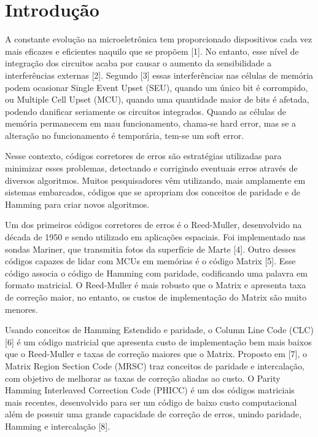 \chapter{Introdução}\label{CAP:introducao}

A constante evolução na microeletrônica tem proporcionado dispositivos cada vez mais eficazes e eficientes naquilo que se propõem [1]. No entanto, esse nível de integração dos circuitos acaba por causar o aumento da sensibilidade a interferências externas [2]. Segundo [3] essas interferências nas células de memória podem ocasionar Single Event Upset (SEU), quando um único bit é corrompido, ou Multiple Cell Upset (MCU), quando uma quantidade maior de bits é afetada, podendo danificar seriamente os circuitos integrados. Quando as células de memória permanecem em mau funcionamento, chama-se hard error, mas se a alteração no funcionamento é temporária, tem-se um soft error.

Nesse contexto, códigos corretores de erros são estratégias utilizadas para minimizar esses problemas, detectando e corrigindo eventuais erros através de diversos algoritmos. Muitos pesquisadores vêm utilizando, mais amplamente em sistemas embarcados, códigos que se apropriam dos conceitos de paridade e de Hamming para criar novos algoritmos.


Um dos primeiros códigos corretores de erros é o Reed-Muller, desenvolvido na década de 1950 e sendo utilizado em aplicações espaciais. Foi implementado nas sondas Mariner, que transmitia fotos da superfície de Marte [4]. Outro desses códigos capazes de lidar com MCUs em memórias é o código Matrix [5]. Esse código associa o código de Hamming com paridade, codificando uma palavra em formato matricial. O Reed-Muller é mais robusto que o Matrix e apresenta taxa de correção maior, no entanto, os custos de implementação do Matrix são muito menores.

Usando conceitos de Hamming Estendido e paridade, o Column Line Code (CLC) [6] é um código matricial que apresenta custo de implementação bem mais baixos que o Reed-Muller e taxas de correção maiores que o Matrix. Proposto em [7], o Matrix Region Section Code (MRSC) traz conceitos de paridade e intercalação, com objetivo de melhorar as taxas de correção aliadas ao custo. O Parity Hamming Interleaved Correction Code (PHICC) é um dos códigos matriciais mais recentes, desenvolvido para ser um código de baixo custo computacional além de possuir uma grande capacidade de correção de erros, unindo paridade, Hamming e intercalação [8].

